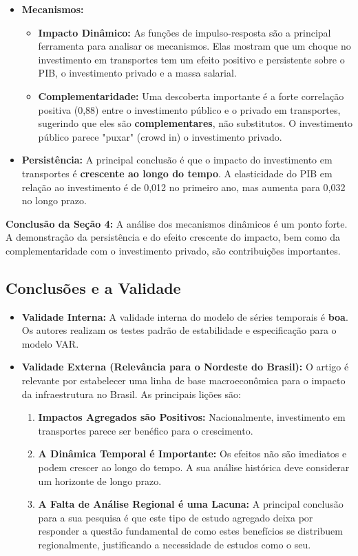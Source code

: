 \documentclass[12pt, a4paper]{article}
\begin{document}
\begin{itemize}
    \item \textbf{Mecanismos:}
        \begin{itemize}
            \item \textbf{Impacto Dinâmico:} As funções de impulso-resposta são a principal ferramenta para analisar os mecanismos. Elas mostram que um choque no investimento em transportes tem um efeito positivo e persistente sobre o PIB, o investimento privado e a massa salarial.
            \item \textbf{Complementaridade:} Uma descoberta importante é a forte correlação positiva (0,88) entre o investimento público e o privado em transportes, sugerindo que eles são \textbf{complementares}, não substitutos. O investimento público parece "puxar" (crowd in) o investimento privado.
        \end{itemize}
    \item \textbf{Persistência:} A principal conclusão é que o impacto do investimento em transportes é \textbf{crescente ao longo do tempo}. A elasticidade do PIB em relação ao investimento é de 0,012 no primeiro ano, mas aumenta para 0,032 no longo prazo.
\end{itemize}

\noindent\textbf{Conclusão da Seção 4:} A análise dos mecanismos dinâmicos é um ponto forte. A demonstração da persistência e do efeito crescente do impacto, bem como da complementaridade com o investimento privado, são contribuições importantes.

\subsection{Conclusões e a Validade}

\begin{itemize}
    \item \textbf{Validade Interna:} A validade interna do modelo de séries temporais é \textbf{boa}. Os autores realizam os testes padrão de estabilidade e especificação para o modelo VAR.
    \item \textbf{Validade Externa (Relevância para o Nordeste do Brasil):} O artigo é relevante por estabelecer uma linha de base macroeconômica para o impacto da infraestrutura no Brasil. As principais lições são:
        \begin{enumerate}
            \item \textbf{Impactos Agregados são Positivos:} Nacionalmente, investimento em transportes parece ser benéfico para o crescimento.
            \item \textbf{A Dinâmica Temporal é Importante:} Os efeitos não são imediatos e podem crescer ao longo do tempo. A sua análise histórica deve considerar um horizonte de longo prazo.
            \item \textbf{A Falta de Análise Regional é uma Lacuna:} A principal conclusão para a sua pesquisa é que este tipo de estudo agregado deixa por responder a questão fundamental de como estes benefícios se distribuem regionalmente, justificando a necessidade de estudos como o seu.
        \end{enumerate}
\end{itemize}
\end{document}
